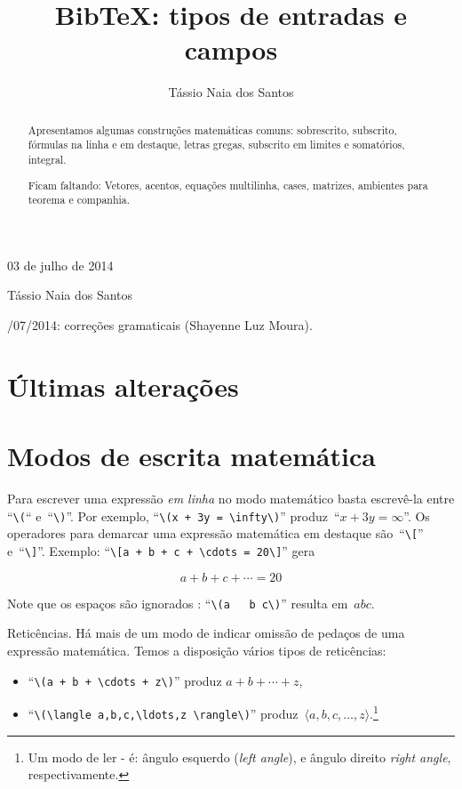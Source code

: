 \documentclass[article,openany]{memoir}
\title{Bib\TeX: tipos de entradas e campos}
\author{Tássio Naia dos Santos}
\begin{document}



\hfill 03 de julho de 2014

\medskip

\noindent Tássio Naia dos Santos

\medskip

/07/2014: correções gramaticais (Shayenne Luz Moura).

\bigskip

\begin{abstract}
Apresentamos algumas construções matemáticas comuns: sobrescrito,
subscrito, fórmulas na linha e em destaque, letras gregas, subscrito
em limites e somatórios, integral. 

Ficam faltando: Vetores, acentos, equações multilinha, cases,
matrizes, ambientes para teorema e companhia.
\end{abstract}

\chapter{Últimas alterações}
\chapter{Modos de escrita matemática}

Para escrever uma expressão \emph{em linha} no modo matemático basta
escrevê-la entre ``\verb/\(/`` e~``\verb/\)/''. Por exemplo,
``\verb/\(x + 3y = \infty\)/'' produz~``\(x + 3y = \infty\)''. Os operadores para
demarcar uma expressão matemática em destaque são~``\verb/\[/''
e~``\verb/\]/''. Exemplo: ``\verb/\[a + b + c + \cdots = 20\]/'' gera

\[a+b+c+\cdots = 20\]

Note que os espaços são ignorados : ``\verb/\(a   b c\)/''
resulta em~\(a   b c\).

Reticências. Há mais de um modo de indicar omissão de pedaços de uma
expressão matemática. Temos a disposição vários tipos de reticências:
\begin{itemize}
\item ``\verb/\(a + b + \cdots + z\)/'' produz \(a+b+\cdots+z\), 
\item ``\verb/\(\langle a,b,c,\ldots,z \rangle\)/'' produz~\(\langle
  a,b,c,\ldots,z\rangle\).\footnote{Um modo de ler
    - é: ângulo esquerdo (\emph{left angle}), e
    ângulo direito \emph{right angle}, respectivamente.}
\end{itemize}
\end{document}
